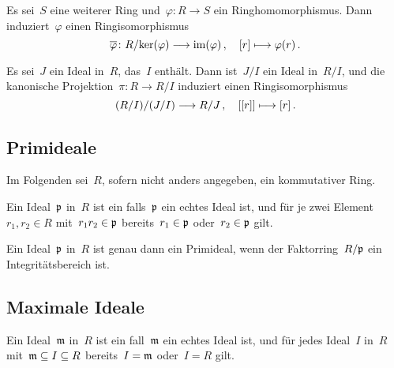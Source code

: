 \begin{corollary}
  Es sei~$S$ eine weiterer Ring und~$\varphi \colon R \to S$ ein Ringhomomorphismus.
  Dann induziert~$\varphi$ einen Ringisomorphismus
  \[
    \induced{\varphi}
    \colon
    R/{\ker(\varphi)} \to \im(\varphi) \,,
    \quad
    \class{r}
    \mapsto
    \varphi(r) \,.
  \]
\end{corollary}


\begin{theorem}
  Es sei~$J$ ein Ideal in~$R$, das~$I$ enthält.
  Dann ist~$J/I$ ein Ideal in~$R/I$, und die kanonische Projektion~$\pi \colon R \to R/I$ induziert einen Ringisomorphismus
  \[
    (R/I) / (J/I)
    \to
    R/J \,,
    \quad
    \class{ \class{r} }
    \mapsto
    \class{r} \,.
  \]
\end{theorem}



\subsection{Primideale}

\begin{convention}
  Im Folgenden sei~$R$, sofern nicht anders angegeben, ein kommutativer Ring.
\end{convention}

\begin{definition}
  Ein Ideal~$\mathfrak{p}$ in~$R$ ist ein  falls~$\mathfrak{p}$ ein echtes Ideal ist, und für je zwei Element~$r_1, r_2 \in R$ mit~$r_1 r_2 \in \mathfrak{p}$ bereits~$r_1 \in \mathfrak{p}$ oder~$r_2 \in \mathfrak{p}$ gilt.
\end{definition}

\begin{proposition}
  Ein Ideal~$\mathfrak{p}$ in~$R$ ist genau dann ein Primideal, wenn der Faktorring~$R/\mathfrak{p}$ ein Integritätsbereich ist.
\end{proposition}



\subsection{Maximale Ideale}

\begin{definition}
  Ein Ideal~$\mathfrak{m}$ in~$R$ ist ein  fall~$\mathfrak{m}$ ein echtes Ideal ist, und für jedes Ideal~$I$ in~$R$ mit~$\mathfrak{m} \subseteq I \subseteq R$ bereits~$I = \mathfrak{m}$ oder~$I = R$ gilt.
\end{definition}

